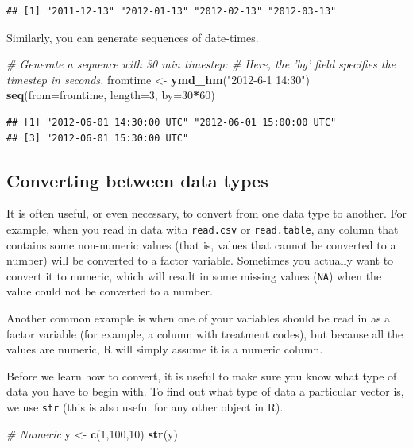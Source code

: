 \documentclass[]{book}
\newenvironment{Shaded}{\begin{snugshade}}{\end{snugshade}}
\newcommand{\CommentTok}[1]{\textcolor[rgb]{0.56,0.35,0.01}{\textit{#1}}}
\newcommand{\DataTypeTok}[1]{\textcolor[rgb]{0.13,0.29,0.53}{#1}}
\newcommand{\DecValTok}[1]{\textcolor[rgb]{0.00,0.00,0.81}{#1}}
\newcommand{\KeywordTok}[1]{\textcolor[rgb]{0.13,0.29,0.53}{\textbf{#1}}}
\newcommand{\NormalTok}[1]{#1}
\newcommand{\OperatorTok}[1]{\textcolor[rgb]{0.81,0.36,0.00}{\textbf{#1}}}
\newcommand{\StringTok}[1]{\textcolor[rgb]{0.31,0.60,0.02}{#1}}
\begin{document}
\begin{verbatim}
## [1] "2011-12-13" "2012-01-13" "2012-02-13" "2012-03-13"
\end{verbatim}

Similarly, you can generate sequences of date-times.

\begin{Shaded}
\begin{Highlighting}[]
\CommentTok{# Generate a sequence with 30 min timestep:}
\CommentTok{# Here, the 'by' field specifies the timestep in seconds.}
\NormalTok{fromtime <-}\StringTok{ }\KeywordTok{ymd_hm}\NormalTok{(}\StringTok{"2012-6-1 14:30"}\NormalTok{)}
\KeywordTok{seq}\NormalTok{(}\DataTypeTok{from=}\NormalTok{fromtime, }\DataTypeTok{length=}\DecValTok{3}\NormalTok{, }\DataTypeTok{by=}\DecValTok{30}\OperatorTok{*}\DecValTok{60}\NormalTok{)}
\end{Highlighting}
\end{Shaded}

\begin{verbatim}
## [1] "2012-06-01 14:30:00 UTC" "2012-06-01 15:00:00 UTC"
## [3] "2012-06-01 15:30:00 UTC"
\end{verbatim}

\hypertarget{converttype}{%
\subsection{Converting between data types}\label{converttype}}

It is often useful, or even necessary, to convert from one data type to another. For example, when you read in data with \texttt{read.csv} or \texttt{read.table}, any column that contains some non-numeric values (that is, values that cannot be converted to a number) will be converted to a factor variable. Sometimes you actually want to convert it to numeric, which will result in some missing values (\texttt{NA}) when the value could not be converted to a number.

Another common example is when one of your variables should be read in as a factor variable (for example, a column with treatment codes), but because all the values are numeric, R will simply assume it is a numeric column.

Before we learn how to convert, it is useful to make sure you know what type of data you have to begin with. To find out what type of data a particular vector is, we use \texttt{str} (this is also useful for any other object in R).

\begin{Shaded}
\begin{Highlighting}[]
\CommentTok{# Numeric}
\NormalTok{y <-}\StringTok{ }\KeywordTok{c}\NormalTok{(}\DecValTok{1}\NormalTok{,}\DecValTok{100}\NormalTok{,}\DecValTok{10}\NormalTok{)}
\KeywordTok{str}\NormalTok{(y)}
\end{Highlighting}
\end{Shaded}
\end{document}
